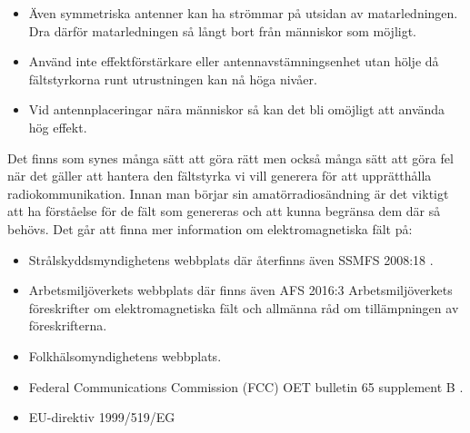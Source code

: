 \begin{itemize}
\item Även symmetriska antenner kan ha strömmar på utsidan av matarledningen.
  Dra därför matarledningen så långt bort från människor som möjligt.
  
\item Använd inte effektförstärkare eller antennavstämningsenhet utan
  hölje då fältstyrkorna runt utrustningen kan nå höga nivåer.

\item Vid antennplaceringar nära människor så kan det bli omöjligt att
  använda hög effekt.
\end{itemize}

Det finns som synes många sätt att göra rätt men också många sätt att göra fel
när det gäller att hantera den fältstyrka vi vill generera för att upprätthålla
radiokommunikation.
Innan man börjar sin amatörradiosändning är det viktigt att ha förståelse för
de fält som genereras och att kunna begränsa dem där så behövs.
Det går att finna mer information om elektromagnetiska fält på:

\begin{itemize}
\item Strålskyddsmyndighetens webbplats där återfinns även SSMFS 2008:18 \cite{SSMFS2008:18}.

\item Arbetsmiljöverkets webbplats där finns även AFS 2016:3 Arbetsmiljöverkets
föreskrifter om elektromagnetiska fält och allmänna råd om tillämpningen av
föreskrifterna.

\item Folkhälsomyndighetens webbplats.

\item Federal Communications Commission (FCC) OET bulletin 65 supplement B \cite{OETbul65b}.

\item EU-direktiv 1999/519/EG \cite{1999/519/EG}
\end{itemize}
